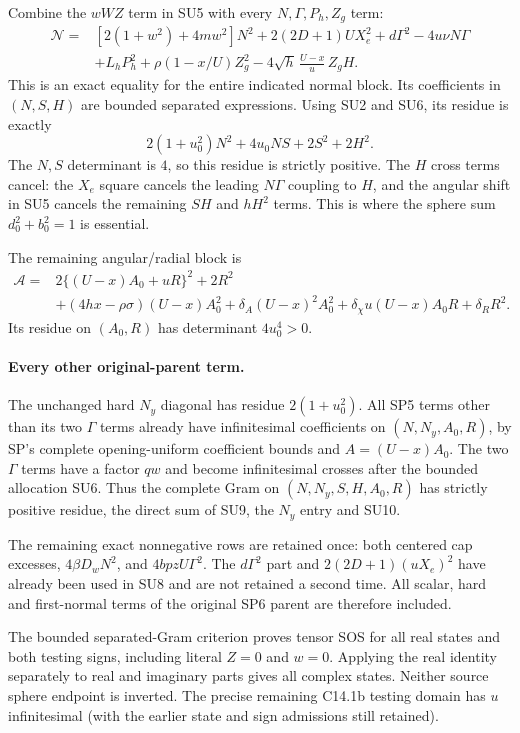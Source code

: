 Combine the $wWZ$ term in SU5 with every $N,\Gamma,P_h,Z_g$ term:
\[
\begin{split}
 \mathscr N={}&[2(1+w^2)+4mw^2]N^2
     +2(2D+1)U X_e^2+d\Gamma^2-4u\nu N\Gamma\\
 &+L_hP_h^2+\rho(1-x/U)Z_g^2
       -4\sqrt h\,\frac{U-x}{u}\,Z_gH .
\end{split} \tag{SU8}
\]
This is an exact equality for the entire indicated normal block.
Its coefficients in $(N,S,H)$ are bounded separated expressions.
Using SU2 and SU6, its residue is exactly
\[
 2(1+u_0^2)N^2+4u_0NS+2S^2+2H^2.
 \tag{SU9}
\]
The $N,S$ determinant is $4$, so this residue is strictly positive.
The $H$ cross terms cancel: the $X_e$ square cancels the leading
$N\Gamma$ coupling to $H$, and the angular shift in SU5 cancels
the remaining $S H$ and $hH^2$ terms.  This is where the sphere
sum $d_0^2+b_0^2=1$ is essential.

The remaining angular/radial block is
\[
\begin{split}
 \mathscr A={}&2\{(U-x)A_0+uR\}^2+2R^2\\
 &+(4hx-\rho\sigma)(U-x)A_0^2
   +\delta_A(U-x)^2A_0^2
   +\delta_\chi u(U-x)A_0R+\delta_RR^2.
\end{split} \tag{SU10}
\]
Its residue on $(A_0,R)$ has determinant $4u_0^4>0$.

\paragraph{Every other original-parent term.}
The unchanged hard $N_y$ diagonal has residue $2(1+u_0^2)$.
All SP5 terms other than its two $\Gamma$ terms already have
infinitesimal coefficients on $(N,N_y,A_0,R)$, by SP's complete
opening-uniform coefficient bounds and $A=(U-x)A_0$.
The two $\Gamma$ terms have a factor $qw$ and become infinitesimal
crosses after the bounded allocation SU6.  Thus the complete Gram
on $(N,N_y,S,H,A_0,R)$ has strictly positive residue, the direct
sum of SU9, the $N_y$ entry and SU10.

The remaining exact nonnegative rows are retained once: both
centered cap excesses, $4\beta D_wN^2$, and
$4bpzU\Gamma^2$.  The $d\Gamma^2$ part and
$2(2D+1)(uX_e)^2$ have already been used in SU8 and are not
retained a second time.  All scalar, hard and first-normal terms
of the original SP6 parent are therefore included.

The bounded separated-Gram criterion proves tensor SOS for all real
states and both testing signs, including literal $Z=0$ and $w=0$.
Applying the real identity separately to real and imaginary parts
gives all complex states.  Neither source sphere endpoint is inverted.
The precise remaining C14.1b testing domain has $u$ infinitesimal
(with the earlier state and sign admissions still retained).

